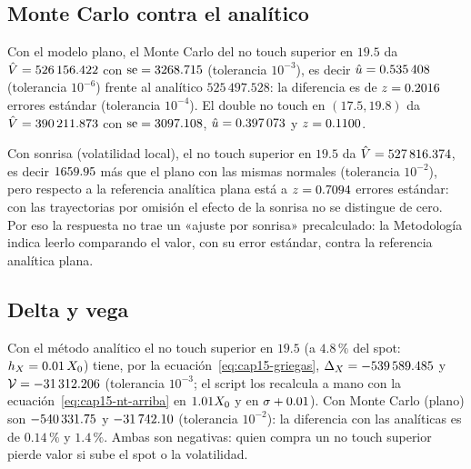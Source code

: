 \subsection{Monte Carlo contra el analítico}\label{sec:cap15-ej-mc}

Con el modelo plano, el Monte Carlo del no touch superior en $19.5$ da $\hat\PV=\verif{cap15-nt-mc-pv}{526156.422}$ \MXN{} con
$\mathrm{se}=\verif{cap15-nt-mc-se}{3268.715}$ \MXN{} (tolerancia $10^{-3}$), es decir $\hat u=\verif{cap15-nt-mc-prob}{0.535408}$
(tolerancia $10^{-6}$) frente al analítico $525\,497.528$: la diferencia es de $z=\verif{cap15-nt-mc-z}{0.2016}$ errores estándar
(tolerancia $10^{-4}$). El double no touch en $(17.5,19.8)$ da $\hat\PV=\verif{cap15-dnt-mc-pv}{390211.873}$ con
$\mathrm{se}=\verif{cap15-dnt-mc-se}{3097.108}$, $\hat u=\verif{cap15-dnt-mc-prob}{0.397073}$ y $z=\verif{cap15-dnt-mc-z}{0.1100}$.

Con sonrisa (volatilidad local), el no touch superior en $19.5$ da $\hat\PV=\verif{cap15-nt-smile-pv}{527816.374}$, es decir
$\verif{cap15-nt-smile-dif}{1659.95}$ \MXN{} más que el plano con las mismas normales (tolerancia $10^{-2}$), pero respecto a
la referencia analítica plana está a $z=\verif{cap15-nt-smile-z}{0.7094}$ errores estándar: con las trayectorias por omisión el efecto de la sonrisa no se
distingue de cero. Por eso la respuesta no trae un «ajuste por sonrisa» precalculado: la Metodología indica leerlo comparando el valor, con su error estándar, contra la
referencia analítica plana.

\subsection{Delta y vega}\label{sec:cap15-ej-griegas}

Con el método analítico el no touch superior en $19.5$ (a $4.8\,\%$ del spot: $h_X=0.01\,\Spot$) tiene, por la ecuación~\eqref{eq:cap15-griegas},
$\Delta_X=\verif{cap15-nt-delta-an}{-539589.485}$ y $\mathcal V=\verif{cap15-nt-vega-an}{-31312.206}$ \MXN{}
(tolerancia $10^{-3}$; el script los recalcula a mano con la ecuación~\eqref{eq:cap15-nt-arriba} en $1.01\Spot$ y en $\vol+0.01$). Con
Monte Carlo (plano) son $\verif{cap15-nt-delta-mc}{-540331.75}$ y $\verif{cap15-nt-vega-mc}{-31742.10}$ (tolerancia $10^{-2}$): la
diferencia con las analíticas es de $0.14\,\%$ y $1.4\,\%$. Ambas son negativas: quien compra un no touch superior pierde valor si sube el spot
o la volatilidad.

